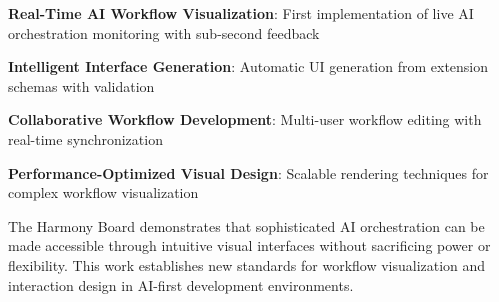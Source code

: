 \begin{expandedlist}
    \item \textbf{Real-Time AI Workflow Visualization}: First implementation of live AI orchestration monitoring with sub-second feedback
    \item \textbf{Intelligent Interface Generation}: Automatic UI generation from extension schemas with validation
    \item \textbf{Collaborative Workflow Development}: Multi-user workflow editing with real-time synchronization
    \item \textbf{Performance-Optimized Visual Design}: Scalable rendering techniques for complex workflow visualization
\end{expandedlist}

The Harmony Board demonstrates that sophisticated AI orchestration can be made accessible through intuitive visual interfaces without sacrificing power or flexibility. This work establishes new standards for workflow visualization and interaction design in AI-first development environments.
